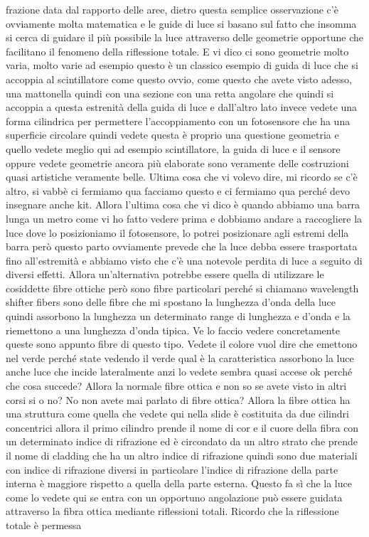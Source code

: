 frazione data dal rapporto delle aree, dietro questa semplice osservazione c'è ovviamente molta matematica e le guide di luce si basano sul fatto che insomma si cerca di guidare il più possibile la luce attraverso delle geometrie opportune che facilitano il fenomeno della riflessione totale. E vi dico ci sono geometrie molto varia, molto varie ad esempio questo è un classico esempio di guida di luce che si accoppia al scintillatore come questo ovvio, come questo che avete visto adesso, una mattonella quindi con una sezione con una retta angolare che quindi si accoppia a questa estrenità della guida di luce e dall'altro lato invece vedete una forma cilindrica per permettere l'accoppiamento con un fotosensore che ha una superficie circolare quindi vedete questa è proprio una questione geometria e quello vedete meglio qui ad esempio scintillatore, la guida di luce e il sensore oppure vedete geometrie ancora più elaborate sono veramente delle costruzioni quasi artistiche veramente belle. Ultima cosa che vi volevo dire, mi ricordo se c'è altro, si vabbè ci fermiamo qua facciamo questo e ci fermiamo qua perché devo insegnare anche kit. Allora l'ultima cosa che vi dico è quando abbiamo una barra lunga un metro come vi ho fatto vedere prima e dobbiamo andare a raccogliere la luce dove lo posizioniamo il fotosensore, lo potrei posizionare agli estremi della barra però questo parto ovviamente prevede che la luce debba essere trasportata fino all'estremità e abbiamo visto che c'è una notevole perdita di luce a seguito di diversi effetti. Allora un'alternativa potrebbe essere quella di utilizzare le cosiddette fibre ottiche però sono fibre particolari perché si chiamano wavelength shifter fibers sono delle fibre che mi spostano la lunghezza d'onda della luce quindi assorbono la lunghezza un determinato range di lunghezza e d'onda e la riemettono a una lunghezza d'onda tipica. Ve lo faccio vedere concretamente queste sono appunto fibre di questo tipo. Vedete il colore vuol dire che emettono nel verde perché state vedendo il verde qual è la caratteristica assorbono la luce anche luce che incide lateralmente anzi lo vedete sembra quasi accese ok perché che cosa succede? Allora la normale fibre ottica e non so se avete visto in altri corsi si o no? No non avete mai parlato di fibre ottica? Allora la fibre ottica ha una struttura come quella che vedete qui nella slide è costituita da due cilindri concentrici allora il primo cilindro prende il nome di cor e il cuore della fibra con un determinato indice di rifrazione ed è circondato da un altro strato che prende il nome di cladding che ha un altro indice di rifrazione quindi sono due materiali con indice di rifrazione diversi in particolare l'indice di rifrazione della parte interna è maggiore rispetto a quella della parte esterna. Questo fa sì che la luce come lo vedete qui se entra con un opportuno angolazione può essere guidata attraverso la fibra ottica mediante riflessioni totali. Ricordo che la riflessione totale è permessa 

